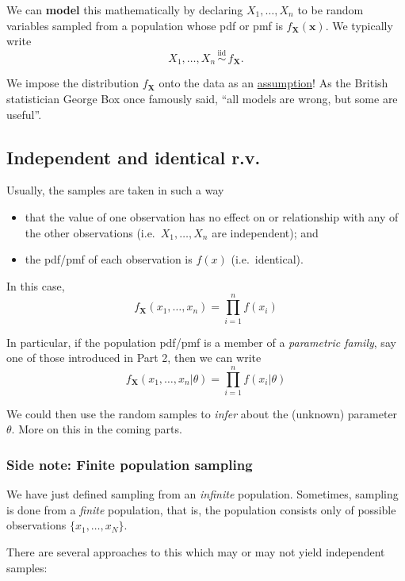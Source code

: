 \documentclass[
]{book}
\providecommand{\tightlist}{%
  \setlength{\itemsep}{0pt}\setlength{\parskip}{0pt}}
\newcommand{\bx}{{\boldsymbol x}}
\newcommand{\bX}{{\boldsymbol X}}
\newcommand{\iid}{\,\overset{\text{iid}}{\sim}\,}
\theoremstyle{definition}
\theoremstyle{definition}
\theoremstyle{definition}
\theoremstyle{definition}
\theoremstyle{remark}
\begin{document}
We can \textbf{model} this mathematically by declaring \(X_1,\dots,X_n\) to be random variables sampled from a population whose pdf or pmf is \(f_{\bX}(\bx)\).
We typically write
\[
X_1,\dots,X_n \iid f_{\bX}.
\]

We impose the distribution \(f_{\bX}\) onto the data as an \uline{assumption}!
As the British statistician George Box once famously said, ``all models are wrong, but some are useful''.

\hypertarget{independent-and-identical-r.v.}{%
\subsection{Independent and identical r.v.}\label{independent-and-identical-r.v.}}

Usually, the samples are taken in such a way

\begin{itemize}
\tightlist
\item
  that the value of one observation has no effect on or relationship with any of the other observations (i.e.~\(X_1,\dots,X_n\) are independent); and
\item
  the pdf/pmf of each observation is \(f(x)\) (i.e.~identical).
\end{itemize}

In this case,
\[
f_{\bX}(x_1,\dots,x_n) = \prod_{i=1}^n f(x_i)
\]

In particular, if the population pdf/pmf is a member of a \emph{parametric family}, say one of those introduced in Part 2, then we can write
\[
f_{\bX}(x_1,\dots,x_n|\theta) = \prod_{i=1}^n f(x_i|\theta)
\]

We could then use the random samples to \emph{infer} about the (unknown) parameter \(\theta\). More on this in the coming parts.

\hypertarget{side-note-finite-population-sampling}{%
\subsubsection*{Side note: Finite population sampling}\label{side-note-finite-population-sampling}}

We have just defined sampling from an \emph{infinite} population. Sometimes, sampling is done from a \emph{finite} population, that is, the population consists only of possible observations \(\{x_1,\dots,x_N \}\).

There are several approaches to this which may or may not yield independent samples:
\end{document}
